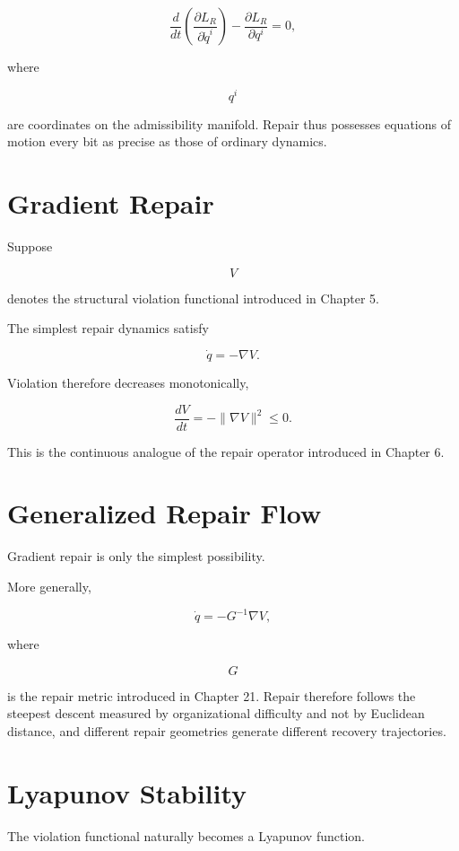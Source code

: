 \documentclass[11pt,oneside]{book}
\numberwithin{equation}{chapter}
\theoremstyle{definition}
\theoremstyle{plain}
\begin{document}
\[
\frac{d}{dt}
\left(
\frac{\partial L_R}
{\partial\dot q^i}
\right)
-
\frac{\partial L_R}
{\partial q^i}
=
0,
\]

where

\[
q^i
\]

are coordinates on the admissibility manifold. Repair thus possesses equations of motion every bit as precise as those of ordinary dynamics.

\section{Gradient Repair}

Suppose

\[
V
\]

denotes the structural violation functional introduced in Chapter 5.

The simplest repair dynamics satisfy

\[
\dot q
=
-
\nabla V.
\]

Violation therefore decreases monotonically,

\[
\frac{dV}{dt}
=
-
\|
\nabla V
\|^2
\le
0.
\]

This is the continuous analogue of the repair operator introduced in Chapter
6.

\section{Generalized Repair Flow}

Gradient repair is only the simplest possibility.

More generally,

\[
\dot q
=
-
G^{-1}
\nabla V,
\]

where

\[
G
\]

is the repair metric introduced in Chapter 21. Repair therefore follows the steepest descent measured by organizational difficulty and not by Euclidean distance, and different repair geometries generate different recovery trajectories.

\section{Lyapunov Stability}

The violation functional naturally becomes a Lyapunov function.
\end{document}
